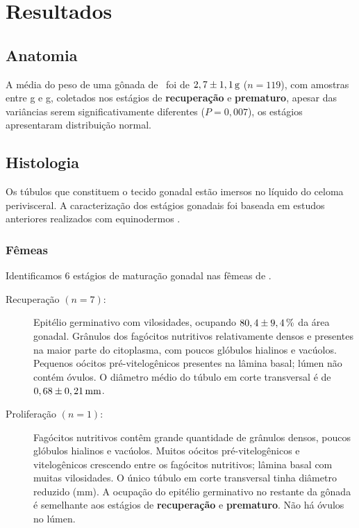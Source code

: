 \section{Resultados}\label{cap3:res}

\subsection{Anatomia}\label{cap3:res:anato}

A média do peso de uma gônada de \subdeshort\ foi de $2,7\pm\unit[1,1]{g}$ ($n=119$), com amostras entre \unit[0,6]{g} e \unit[7,7]{g}, coletados nos estágios de \textbf{recuperação} e \textbf{prematuro}, apesar das variâncias serem significativamente diferentes ($P=0,007$), os estágios apresentaram distribuição normal.

\subsection{Histologia}\label{cap3:res:histo}

Os túbulos que constituem o tecido gonadal estão imersos no líquido do celoma perivisceral.
A caracterização dos estágios gonadais foi baseada em estudos anteriores realizados com equinodermos \citep[e.g.,][]{Lane1979,Byrne1990,Pearse1991,MacCord2004,Walker2005,Tavares2006}.

\subsubsection{Fêmeas}\label{cap3:res:femeas}

Identificamos 6 estágios de maturação gonadal nas fêmeas de \subdeshort.

\begin{description}
  \item[Recuperação $(n=7)$:] Epitélio germinativo com vilosidades, ocupando $80,4\pm\unit[9,4]{\%}$ da área gonadal.
    Grânulos dos fagócitos nutritivos relativamente densos e presentes na maior parte do citoplasma, com poucos glóbulos hialinos e vacúolos.
    Pequenos oócitos pré-vitelogênicos presentes na lâmina basal; lúmen não contém óvulos.
    O diâmetro médio do túbulo em corte transversal é de $0,68\pm\unit[0,21]{mm}$.
  \item[Proliferação $(n=1)$:] Fagócitos nutritivos contêm grande quantidade de grânulos densos, poucos glóbulos hialinos e vacúolos.
    Muitos oócitos pré-vitelogênicos e vitelogênicos crescendo entre os fagócitos nutritivos; lâmina basal com muitas vilosidades.
    O único túbulo em corte transversal tinha diâmetro reduzido (\unit[0,36]{mm}).
    A ocupação do epitélio germinativo no restante da gônada é semelhante aos estágios de \textbf{recuperação} e \textbf{prematuro}.
    Não há óvulos no lúmen.
\end{description}

